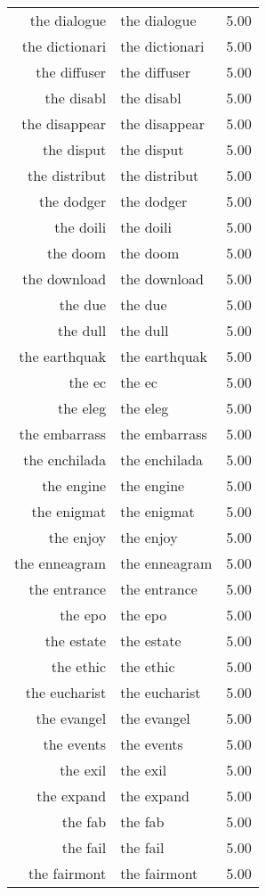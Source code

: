 \begin{table}[ht]
\begin{tabular}{rlr}
  the dialogue & the dialogue & 5.00 \\ 
  the dictionari & the dictionari & 5.00 \\ 
  the diffuser & the diffuser & 5.00 \\ 
  the disabl & the disabl & 5.00 \\ 
  the disappear & the disappear & 5.00 \\ 
  the disput & the disput & 5.00 \\ 
  the distribut & the distribut & 5.00 \\ 
  the dodger & the dodger & 5.00 \\ 
  the doili & the doili & 5.00 \\ 
  the doom & the doom & 5.00 \\ 
  the download & the download & 5.00 \\ 
  the due & the due & 5.00 \\ 
  the dull & the dull & 5.00 \\ 
  the earthquak & the earthquak & 5.00 \\ 
  the ec & the ec & 5.00 \\ 
  the eleg & the eleg & 5.00 \\ 
  the embarrass & the embarrass & 5.00 \\ 
  the enchilada & the enchilada & 5.00 \\ 
  the engine & the engine & 5.00 \\ 
  the enigmat & the enigmat & 5.00 \\ 
  the enjoy & the enjoy & 5.00 \\ 
  the enneagram & the enneagram & 5.00 \\ 
  the entrance & the entrance & 5.00 \\ 
  the epo & the epo & 5.00 \\ 
  the estate & the estate & 5.00 \\ 
  the ethic & the ethic & 5.00 \\ 
  the eucharist & the eucharist & 5.00 \\ 
  the evangel & the evangel & 5.00 \\ 
  the events & the events & 5.00 \\ 
  the exil & the exil & 5.00 \\ 
  the expand & the expand & 5.00 \\ 
  the fab & the fab & 5.00 \\ 
  the fail & the fail & 5.00 \\ 
  the fairmont & the fairmont & 5.00 \\ 

\end{tabular}
\end{table}
